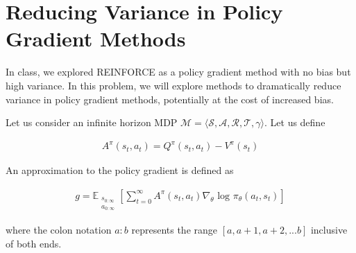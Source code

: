 \section{Reducing Variance in Policy Gradient Methods}

In class, we explored REINFORCE as a policy gradient method with no bias but high variance. In this problem, we will explore methods to dramatically reduce variance in policy gradient methods, potentially at the cost of increased bias. 

Let us consider an infinite horizon MDP $\mathcal{M} = \langle \mathcal{S}, \mathcal{A}, \mathcal{R}, \mathcal{T}, \gamma \rangle$. Let us define 

\begin{align*} 
A^{\pi}(s_t, a_t) = Q^{\pi}(s_t, a_t) - V^{\pi}(s_t)
\end{align*}

An approximation to the policy gradient is defined as

\begin{align*}
    g = \mathbb{E}_{\substack{s_{0:\infty}  \\ a_{0:\infty}}}[\sum_{t=0}^{\infty} A^{\pi}(s_t, a_t) \nabla_{\theta} \text{ log } \pi_{\theta}(a_t, s_t)]
\end{align*}

where the colon notation $a:b$ represents the range $[a, a+1, a+2, ... b]$ inclusive of both ends. 


\begin{enumerate}[(a)]

	

	

	

	

	

	

\end{enumerate}